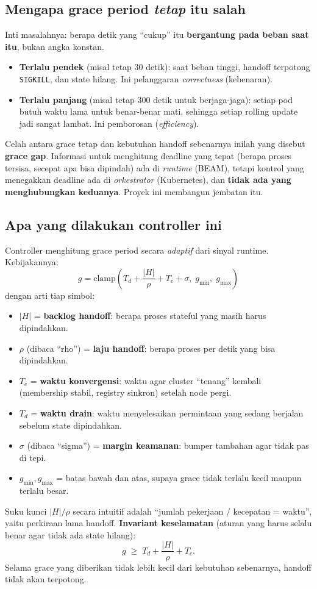 \documentclass[11pt]{article}
\newcommand{\code}[1]{\texttt{\small #1}}
\begin{document}
\subsection{Mengapa grace period \emph{tetap} itu salah}
Inti masalahnya: berapa detik yang ``cukup'' itu \textbf{bergantung pada beban saat itu}, bukan angka
konstan.
\begin{itemize}
  \item \textbf{Terlalu pendek} (misal tetap 30 detik): saat beban tinggi, handoff terpotong
  \code{SIGKILL}, dan state hilang. Ini pelanggaran \emph{correctness} (kebenaran).
  \item \textbf{Terlalu panjang} (misal tetap 300 detik untuk berjaga-jaga): setiap pod butuh waktu
  lama untuk benar-benar mati, sehingga setiap rolling update jadi sangat lambat. Ini pemborosan
  (\emph{efficiency}).
\end{itemize}
Celah antara grace tetap dan kebutuhan handoff sebenarnya inilah yang disebut \textbf{grace gap}.
Informasi untuk menghitung deadline yang tepat (berapa proses tersisa, secepat apa bisa dipindah) ada
di \emph{runtime} (BEAM), tetapi kontrol yang menegakkan deadline ada di \emph{orkestrator}
(Kubernetes), dan \textbf{tidak ada yang menghubungkan keduanya}. Proyek ini membangun jembatan itu.

\subsection{Apa yang dilakukan controller ini}
\label{sec:grace-formula}
Controller menghitung grace period secara \emph{adaptif} dari sinyal runtime. Kebijakannya:
\[
  g = \mathrm{clamp}\!\left(T_d + \frac{|H|}{\rho} + T_c + \sigma,\; g_{\min},\; g_{\max}\right)
\]
dengan arti tiap simbol:
\begin{itemize}
  \item $|H|$ = \textbf{backlog handoff}: berapa proses stateful yang masih harus dipindahkan.
  \item $\rho$ (dibaca ``rho'') = \textbf{laju handoff}: berapa proses per detik yang bisa dipindahkan.
  \item $T_c$ = \textbf{waktu konvergensi}: waktu agar cluster ``tenang'' kembali (membership stabil,
  registry sinkron) setelah node pergi.
  \item $T_d$ = \textbf{waktu drain}: waktu menyelesaikan permintaan yang sedang berjalan sebelum
  state dipindahkan.
  \item $\sigma$ (dibaca ``sigma'') = \textbf{margin keamanan}: bumper tambahan agar tidak pas di tepi.
  \item $g_{\min}, g_{\max}$ = batas bawah dan atas, supaya grace tidak terlalu kecil maupun terlalu
  besar.
\end{itemize}
Suku kunci $|H|/\rho$ secara intuitif adalah ``jumlah pekerjaan / kecepatan = waktu'', yaitu perkiraan
lama handoff. \textbf{Invariant keselamatan} (aturan yang harus selalu benar agar tidak ada state
hilang):
\[
  g \;\ge\; T_d + \frac{|H|}{\rho} + T_c .
\]
Selama grace yang diberikan tidak lebih kecil dari kebutuhan sebenarnya, handoff tidak akan terpotong.
\end{document}
